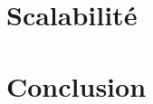 \documentclass[
    iict, %
    il, %
]{heig-tb}
\begin{document}
\chapter{Scalabilité}


% 
% 

\chapter{Conclusion}


\clearpage
\printbibliography

\appendix
\appendixpage
\addappheadtotoc





\let\cleardoublepage\clearpage
\backmatter

\label{glossaire}
\printnoidxglossary
\label{index}
\printindex

% 
\end{document}
